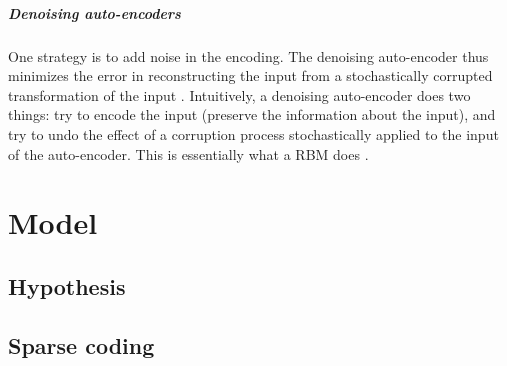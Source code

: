 \paragraph{Denoising auto-encoders}
One strategy is to add noise in the encoding. The denoising auto-encoder thus minimizes the error in reconstructing the input from a stochastically corrupted transformation of the input \cite{bengio2008denoisingAutoencoders}. Intuitively, a denoising auto-encoder does two things: try to encode the input (preserve the information about the input), and try to undo the effect of a corruption process stochastically applied to the input of the auto-encoder. This is essentially what a \gls{RBM} does \cite{hinton2002RBM}.




\chapter{Model} \label{chap:model}

\section{Hypothesis} \label{sec:hypothesis}




\section{Sparse coding} \label{sec:sparse_coding}

